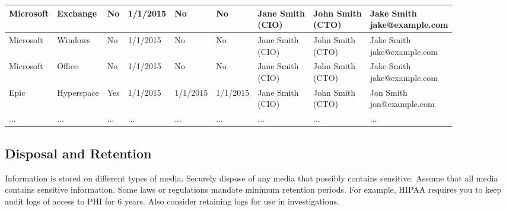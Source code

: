 \begin{landscape}
\begin{table}[h]
\begin{center}
\begin{tabular}{|l|l|l|l|l|l|l|l|l|}
Microsoft & Exchange & No & 1/1/2015 & No & No & \parbox[t]{1.6cm}{Jane Smith\\(CIO)} & \parbox[t]{1.6cm}{John Smith\\(CTO)} & \parbox[t]{3.2cm}{Jake Smith\\jake@example.com}\\\hline
Microsoft & Windows & No & 1/1/2015 & No & No & \parbox[t]{1.6cm}{Jane Smith\\(CIO)} & \parbox[t]{1.6cm}{John Smith\\(CTO)} & \parbox[t]{3.2cm}{Jake Smith\\jake@example.com}\\\hline
Microsoft & Office & No & 1/1/2015 & No & No & \parbox[t]{1.6cm}{Jane Smith\\(CIO)} & \parbox[t]{1.6cm}{John Smith\\(CTO)} & \parbox[t]{3.2cm}{Jake Smith\\jake@example.com}\\\hline
Epic & Hyperspace & Yes & 1/1/2015 & 1/1/2015 & 1/1/2015 & \parbox[t]{1.6cm}{Jane Smith\\(CIO)} & \parbox[t]{1.6cm}{John Smith\\(CTO)} & \parbox[t]{3.2cm}{Jon Smith\\jon@example.com}\\\hline
... &...&...&...&...&...&...&...&...\\\hline
\end{tabular}\end{center}\end{table}
\end{landscape}
\subsection{Disposal and Retention}\label{subsec:"Disposal and Retention"}
Information is stored on different types of media. Securely dispose of any media that possibly contains sensitive. Assume that all media contains sensitive information. Some laws or regulations mandate minimum retention periods. For example, HIPAA requires you to keep audit logs of access to PHI for 6 years. Also consider retaining logs for use in investigations.
